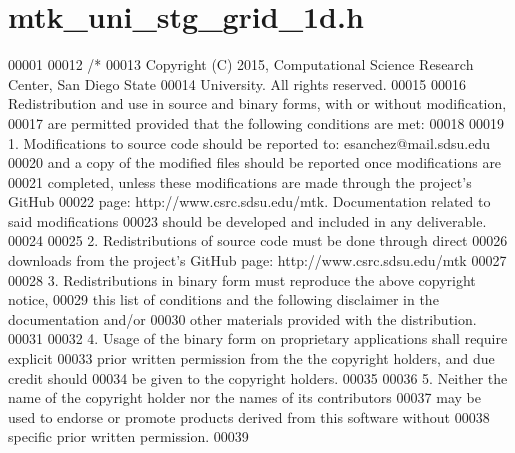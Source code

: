 \hypertarget{mtk__uni__stg__grid__1d_8h_source}{\section{mtk\+\_\+uni\+\_\+stg\+\_\+grid\+\_\+1d.\+h}
\label{mtk__uni__stg__grid__1d_8h_source}
}

\begin{DoxyCode}
00001 
00012 \textcolor{comment}{/*}
00013 \textcolor{comment}{Copyright (C) 2015, Computational Science Research Center, San Diego State}
00014 \textcolor{comment}{University. All rights reserved.}
00015 \textcolor{comment}{}
00016 \textcolor{comment}{Redistribution and use in source and binary forms, with or without modification,}
00017 \textcolor{comment}{are permitted provided that the following conditions are met:}
00018 \textcolor{comment}{}
00019 \textcolor{comment}{1. Modifications to source code should be reported to: esanchez@mail.sdsu.edu}
00020 \textcolor{comment}{and a copy of the modified files should be reported once modifications are}
00021 \textcolor{comment}{completed, unless these modifications are made through the project's GitHub}
00022 \textcolor{comment}{page: http://www.csrc.sdsu.edu/mtk. Documentation related to said modifications}
00023 \textcolor{comment}{should be developed and included in any deliverable.}
00024 \textcolor{comment}{}
00025 \textcolor{comment}{2. Redistributions of source code must be done through direct}
00026 \textcolor{comment}{downloads from the project's GitHub page: http://www.csrc.sdsu.edu/mtk}
00027 \textcolor{comment}{}
00028 \textcolor{comment}{3. Redistributions in binary form must reproduce the above copyright notice,}
00029 \textcolor{comment}{this list of conditions and the following disclaimer in the documentation and/or}
00030 \textcolor{comment}{other materials provided with the distribution.}
00031 \textcolor{comment}{}
00032 \textcolor{comment}{4. Usage of the binary form on proprietary applications shall require explicit}
00033 \textcolor{comment}{prior written permission from the the copyright holders, and due credit should}
00034 \textcolor{comment}{be given to the copyright holders.}
00035 \textcolor{comment}{}
00036 \textcolor{comment}{5. Neither the name of the copyright holder nor the names of its contributors}
00037 \textcolor{comment}{may be used to endorse or promote products derived from this software without}
00038 \textcolor{comment}{specific prior written permission.}
00039 \textcolor{comment}{}

\end{DoxyCode}
